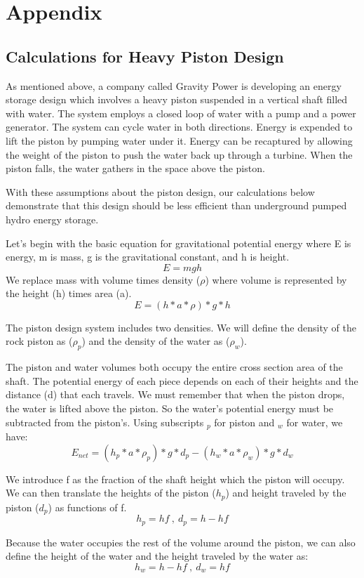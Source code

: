 \section{Appendix}

\subsection{Calculations for Heavy Piston Design}
As mentioned above, a company called Gravity Power is developing an energy storage design which involves a heavy piston suspended in a vertical shaft filled with water. The system employs a closed loop of water with a pump and a power generator. The system can cycle water in both directions. Energy is expended to lift the piston by pumping water under it. Energy can be recaptured by allowing the weight of the piston to push the water back up through a turbine. When the piston falls, the water gathers in the space above the piston.

With these assumptions about the piston design, our calculations below demonstrate that this design should be less efficient than underground pumped hydro energy storage.

Let's begin with the basic equation for gravitational potential energy where E is energy, m is mass, g is the gravitational constant, and h is height.
\[ E = mgh \]
We replace mass with volume times density ($\rho$) where volume is represented by the height (h) times area (a).
\[ E = (h*a*\rho)*g*h \]

The piston design system includes two densities. We will define the density of the rock piston as ($\rho_p$) and the density of the water as ($\rho_w$).

The piston and water volumes both occupy the entire cross section area of the shaft. The potential energy of each piece depends on each of their heights and the distance (d) that each travels. We must remember that when the piston drops, the water is lifted above the piston. So the water's potential energy must be subtracted from the piston's. Using subscripts $_p$ for piston and $_w$ for water, we have:
\[ E_{net} = (h_p*a*\rho_p)*g*d_p - (h_w*a*\rho_w)*g*d_w  \]

We introduce f as the fraction of the shaft height which the piston will occupy. We can then translate the heights of the piston ($h_p$) and height traveled by the piston ($d_p$) as functions of f.
\[ h_p = hf \ , \ d_p = h-hf \]

Because the water occupies the rest of the volume around the piston, we can also define the height of the water and the height traveled by the water as:
\[ h_w = h-hf\ , \ d_w = hf \]

